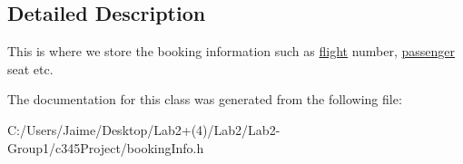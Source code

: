 \subsection{Detailed Description}
This is where we store the booking information such as \hyperlink{classflight}{flight} number, \hyperlink{classpassenger}{passenger} seat etc. 

The documentation for this class was generated from the following file:\begin{DoxyCompactItemize}
\item 
C:/Users/Jaime/Desktop/Lab2+(4)/Lab2/Lab2-\/Group1/c345Project/bookingInfo.h\end{DoxyCompactItemize}
